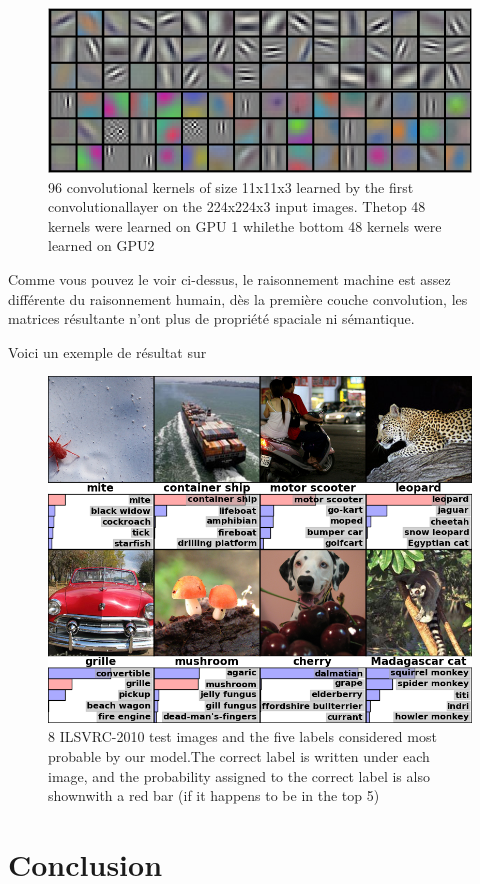 \documentclass[12pt, letterpaper]{article}
\begin{document}
\begin{figure}[H]
    \includegraphics[width=\linewidth]{img/fig10.png}
    \caption{96 convolutional kernels of size 11x11x3 learned by the first convolutionallayer on the 224x224x3 input images. Thetop 48 kernels were learned on GPU 1 whilethe bottom 48 kernels were learned on GPU2}
    \label{fig:L9}
\end{figure}

Comme vous pouvez le voir ci-dessus, le raisonnement machine est assez différente du raisonnement humain, dès la première couche convolution, les matrices résultante n'ont plus 
de propriété spaciale ni sémantique. 

Voici un exemple de résultat sur 

\begin{figure}[H]
    \includegraphics[width=\linewidth]{img/fig11.png}
    \caption{8 ILSVRC-2010 test images and the five labels considered most probable by our model.The correct label is written under each image, and the probability assigned to the correct label is also shownwith a red bar (if it happens to be in the top 5)}
    \label{fig:L10}
\end{figure}

\section{Conclusion}

\newpage
\printbibliography
\end{document}
